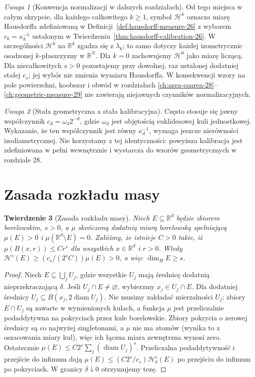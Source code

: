 \documentclass[11pt,a4paper,oneside]{book}
\numberwithin{equation}{chapter}
\theoremstyle{plain}
\newtheorem{twierdzenie}{Twierdzenie}[chapter]
\theoremstyle{definition}
\theoremstyle{remark}
\newtheorem{uwaga}[twierdzenie]{Uwaga}
\begin{document}
\begin{uwaga}[Konwencja normalizacji w dalszych rozdziałach]
\label{rem:hausdorff-convention-26}
Od tego miejsca w całym skrypcie, dla każdego całkowitego
$k\ge1$, symbol $\mathcal H^k$ oznacza miarę Hausdorffa
zdefiniowaną w Definicji~\ref{def:hausdorff-measure-26}
z wyborem $c_k=\kappa_k^{-1}$ ustalonym w
Twierdzeniu~\ref{thm:hausdorff-calibration-26}.
W szczególności $\mathcal H^k$ na $\mathbb R^k$
zgadza się z $\lambda_k$; to samo dotyczy każdej
izometrycznie osadzonej $k$-płaszczyzny w $\mathbb R^N$.
Dla $k=0$ zachowujemy $\mathcal H^0$ jako miarę liczącą.
Dla niecałkowitych $s>0$ pozostajemy przy dowolnej,
raz ustalonej dodatniej stałej $c_s$; jej wybór nie
zmienia wymiaru Hausdorffa. W konsekwencji wzory
na pole powierzchni, koobszar i obwód w rozdziałach
\ref{ch:area-coarea-28}--\ref{ch:geometric-measure-29}
nie zawierają niejawnych czynników normalizacyjnych.
\end{uwaga}

\begin{uwaga}[Stała geometryczna a stała kalibracyjna]
Często stosuje się jawny współczynnik
$c_d=\omega_d2^{-d}$, gdzie $\omega_d$ jest
objętością euklidesowej kuli jednostkowej.
Wykazanie, że ten współczynnik jest równy
$\kappa_d^{-1}$, wymaga jeszcze nierówności
izodiametrycznej. Nie korzystamy z tej
identyczności: powyższa kalibracja jest
zdefiniowana w pełni wewnętrznie i wystarcza
do wzorów geometrycznych w rozdziale 28.
\end{uwaga}

\section{Zasada rozkładu masy}
\begin{twierdzenie}[Zasada rozkładu masy]
\label{thm:mass-distribution-26}
Niech $E\subseteq\mathbb R^d$ będzie zbiorem borelowskim,
$s>0$, a $\mu$ skończoną dodatnią miarą borelowską
spełniającą $\mu(E)>0$ i $\mu(\mathbb R^d\setminus E)=0$.
Załóżmy, że istnieje $C>0$ takie, iż
$\mu(B(x,r))\le Cr^s$ dla wszystkich
$x\in\mathbb R^d$ i $r>0$. Wtedy
$\mathcal H^s(E)\ge(c_s/(2^sC))\mu(E)>0$,
a więc $\dim_HE\ge s$.
\end{twierdzenie}
\begin{proof}
Niech $E\subseteq\bigcup_jU_j$, gdzie wszystkie
$U_j$ mają średnicę dodatnią nieprzekraczającą $\delta$.
Jeśli $U_j\cap E\ne\varnothing$, wybierzmy
$x_j\in U_j\cap E$. Dla dodatniej średnicy
$U_j\subseteq B(x_j,2\operatorname{diam}U_j)$.
Nie musimy zakładać mierzalności $U_j$: zbiory
$E\cap U_j$ są zawarte w wymienionych kulach,
a funkcja $\mu$ jest przeliczalnie podaddytywna
na pokryciach przez kule borelowskie. Zbiory pokrycia
o zerowej średnicy są co najwyżej singletonami,
a $\mu$ nie ma atomów (wynika to z oszacowania
miary kul), więc ich łączna miara zewnętrzna
wynosi zero. Ostatecznie
$\mu(E)\le C2^s\sum_j(\operatorname{diam}U_j)^s$.
Przeliczalna podaddytywność i przejście do infimum dają
$\mu(E)\le(C2^s/c_s)\mathcal H^s_\delta(E)$
po przejściu do infimum po pokryciach. W granicy
$\delta\downarrow0$ otrzymujemy tezę.
\end{proof}
\end{document}

